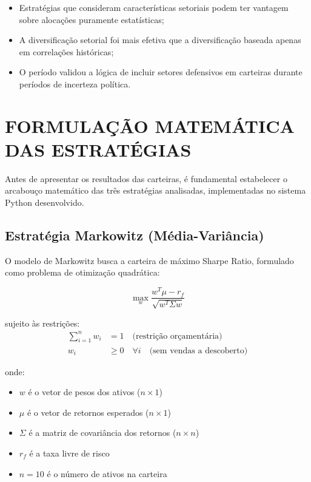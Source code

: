 \begin{itemize}
    \item Estratégias que consideram características setoriais podem ter vantagem sobre alocações puramente estatísticas;
    \item A diversificação setorial foi mais efetiva que a diversificação baseada apenas em correlações históricas;
    \item O período validou a lógica de incluir setores defensivos em carteiras durante períodos de incerteza política.
\end{itemize}

\section{FORMULAÇÃO MATEMÁTICA DAS ESTRATÉGIAS}

Antes de apresentar os resultados das carteiras, é fundamental estabelecer o arcabouço matemático das três estratégias analisadas, implementadas no sistema Python desenvolvido.

\subsection{Estratégia Markowitz (Média-Variância)}

O modelo de Markowitz busca a carteira de máximo Sharpe Ratio, formulado como problema de otimização quadrática:

\begin{equation}
\max_w \frac{w^T \mu - r_f}{\sqrt{w^T \Sigma w}}
\end{equation}

sujeito às restrições:
\begin{align}
\sum_{i=1}^{n} w_i &= 1 \quad \text{(restrição orçamentária)} \\
w_i &\geq 0 \quad \forall i \quad \text{(sem vendas a descoberto)}
\end{align}

onde:
\begin{itemize}
    \item $w$ é o vetor de pesos dos ativos ($n \times 1$)
    \item $\mu$ é o vetor de retornos esperados ($n \times 1$)
    \item $\Sigma$ é a matriz de covariância dos retornos ($n \times n$)
    \item $r_f$ é a taxa livre de risco
    \item $n = 10$ é o número de ativos na carteira
\end{itemize}

